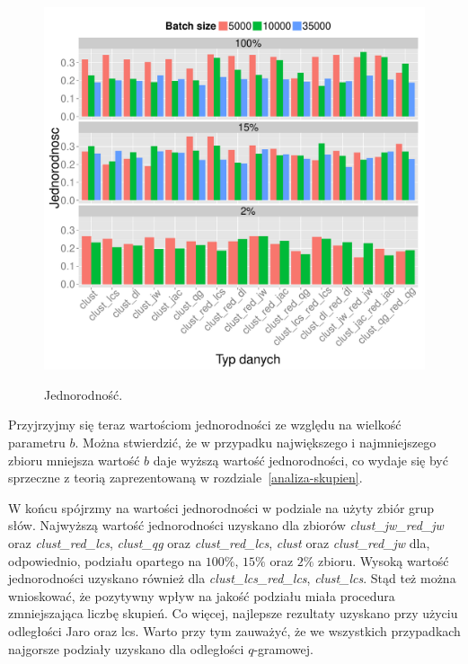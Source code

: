 \documentclass{praca1}
\begin{document}
\begin{figure}[!h]
  \centering
  \includegraphics[width=420pt]{plot10.pdf}\\
  \caption{Jednorodność.}\label{plot:005}
\end{figure}

Przyjrzyjmy się teraz wartościom jednorodności ze względu na wielkość parametru $b$. Można stwierdzić, że w przypadku największego i najmniejszego zbioru mniejsza wartość $b$ daje wyższą wartość jednorodności, co wydaje się być sprzeczne z teorią zaprezentowaną w rozdziale~\ref{analiza-skupien}.

W końcu spójrzmy na wartości jednorodności w podziale na użyty zbiór grup słów. Najwyższą wartość jednorodności uzyskano dla zbiorów \emph{clust\_jw\_red\_jw} oraz \emph{clust\_red\_lcs}, \emph{clust\_qg} oraz \emph{clust\_red\_lcs}, \emph{clust} oraz \emph{clust\_red\_jw} dla, odpowiednio, podziału opartego na $100\%$, $15\%$ oraz $2\%$ zbioru. Wysoką wartość jednorodności uzyskano również dla \emph{clust\_lcs\_red\_lcs}, \emph{clust\_lcs}. Stąd też można wnioskować, że pozytywny wpływ na jakość podziału miała procedura zmniejszająca liczbę skupień. Co więcej, najlepsze rezultaty uzyskano przy użyciu odległości Jaro oraz lcs. Warto przy tym zauważyć, że we wszystkich przypadkach najgorsze podziały uzyskano dla odległości $q$-gramowej.
\end{document}
